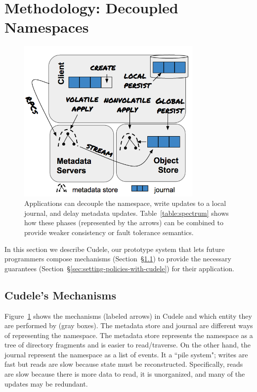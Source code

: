 \section{Methodology: Decoupled Namespaces}
\label{sec:methodology-decoupled-namespaces}

\begin{figure}[tb]
\caption{Applications can decouple the namespace, write updates to a local
journal, and delay metadata updates.  Table~\ref{table:spectrum} shows how
these phases (represented by the arrows) can be combined to provide weaker
consistency or fault tolerance semantics.  }\label{fig:decouple}
\centering
\includegraphics[width=90mm]{figures/fig-decouple.png}
\end{figure}

In this section we describe Cudele, our prototype system that lets future
programmers compose mechanisms (Section~\S\ref{sec:cudeles-mechanisms}) to
provide the necessary guarantees
(Section~\S\ref{sec:setting-policies-with-cudele}) for their application.

\subsection{Cudele's Mechanisms}
\label{sec:cudeles-mechanisms}

Figure~\ref{fig:decouple} shows the mechanisms (labeled arrows) in Cudele and
which entity they are performed by (gray boxes). The metadata store and journal
are different ways of representing the namespace. The metadata store represents
the namespace as a tree of directory fragments and is easier to read/traverse.
On the other hand, the journal represent the namespace as a list of events. It
a ``pile system"; writes are fast but reads are slow because state must be
reconstructed.  Specifically, reads are slow because there is more data to
read, it is unorganized, and many of the updates may be redundant.

